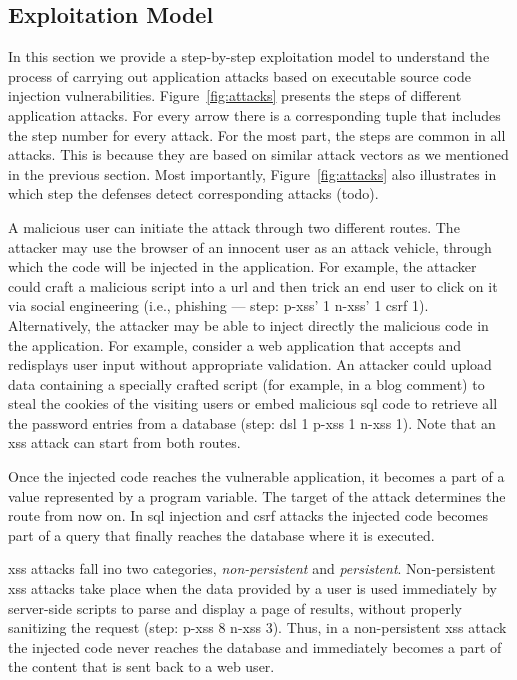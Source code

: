 \documentclass[conference]{IEEEtran}
\begin{document}

\subsection{Exploitation Model}
\label{sec:model}

In this section we provide a step-by-step exploitation model to
understand the process of carrying out application attacks based on
executable source code injection vulnerabilities.
Figure~\ref{fig:attacks} presents the steps of different application
attacks. For every arrow there is a
corresponding tuple that includes the step number for
every attack. For the most part, the steps are common in all attacks. This
is because they are based on similar attack vectors as we mentioned in
the previous section. Most importantly,
Figure~\ref{fig:attacks} also illustrates in which step
the defenses detect corresponding attacks ({\sc todo}).

A malicious user can initiate the attack through two different routes.
The attacker may use the browser of an innocent user as an attack
vehicle, through which the code will be injected in the application.
For example, the attacker could craft a malicious script into a {\sc url}
and then trick an end user to click on it via social engineering (i.e., phishing ---
{\sc step}: {\sc p-xss}' 1 \text{\textbar} {\sc n-xss}' 1 \text{\textbar} {\sc csrf} 1).
Alternatively, the attacker may be able to inject
directly the malicious code in the application. For example, consider
a web application that accepts and redisplays user input
without appropriate validation. An attacker could
upload data containing a specially crafted script (for example, in a
blog comment) to steal the cookies of the visiting users or embed
malicious {\sc sql} code to retrieve all the password entries from a
database ({\sc step}: {\sc dsl} 1 \text{\textbar}
{\sc p-xss} 1 \text{\textbar} {\sc n-xss} 1).
Note that an {\sc xss} attack can start from both routes.

Once the injected code reaches the vulnerable application, it becomes
a part of a value represented by a program variable. The target of the
attack determines the route from now on. In {\sc sql} injection and
{\sc csrf} attacks the injected code becomes part of a query that
finally reaches the database where it is executed. 

{\sc xss} attacks fall ino two categories, {\it non-persistent} and
{\it persistent}. Non-persistent {\sc xss} attacks take place when the
data provided by a user is used immediately by server-side scripts to
parse and display a page of results, without properly sanitizing the
request ({\sc step}: {\sc p-xss} 8 \text{\textbar} {\sc n-xss} 3).
Thus, in a non-persistent {\sc xss} attack the injected code
never reaches the database and immediately becomes a part of the
content that is sent back to a web user.
\end{document}
